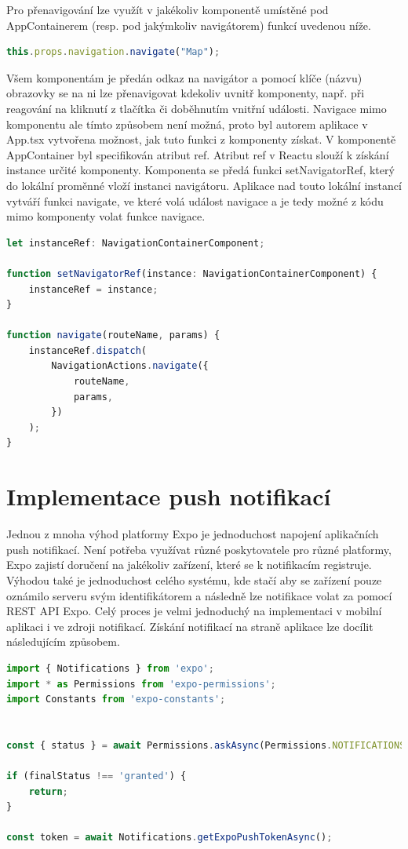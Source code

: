 Pro přenavigování lze využít v jakékoliv komponentě umístěné pod AppContainerem (resp. pod jakýmkoliv navigátorem) funkcí uvedenou níže.

\begin{lstlisting}[language=JavaScript, caption=Přenavigování]
this.props.navigation.navigate("Map");
\end{lstlisting}

Všem komponentám je předán odkaz na navigátor a pomocí klíče (názvu) obrazovky se na ni lze přenavigovat kdekoliv uvnitř komponenty, např. při reagování na kliknutí z tlačítka či doběhnutím vnitřní události. Navigace mimo komponentu ale tímto způsobem není možná, proto byl autorem aplikace v App.tsx vytvořena možnost, jak tuto funkci z komponenty získat. V komponentě AppContainer byl specifikován atribut ref. Atribut ref v Reactu slouží k získání instance určité komponenty. Komponenta se předá funkci setNavigatorRef, který do lokální proměnné vloží instanci navigátoru. Aplikace nad touto lokální instancí vytváří funkci navigate, ve které volá událost navigace a je tedy možné z kódu mimo komponenty volat funkce navigace.

\begin{lstlisting}[language=JavaScript, caption=Přenavigování]
let instanceRef: NavigationContainerComponent;

function setNavigatorRef(instance: NavigationContainerComponent) {
	instanceRef = instance;
}

function navigate(routeName, params) {
	instanceRef.dispatch(
		NavigationActions.navigate({
			routeName,
			params,
		})
	);
}
\end{lstlisting}

\section{Implementace push notifikací}

Jednou z mnoha výhod platformy Expo je jednoduchost napojení aplikačních push notifikací. Není potřeba využívat různé poskytovatele pro různé platformy, Expo zajistí doručení na jakékoliv zařízení, které se k notifikacím registruje. Výhodou také je jednoduchost celého systému, kde stačí aby se zařízení pouze oznámilo serveru svým identifikátorem a následně lze notifikace volat za pomocí REST API Expo. Celý proces je velmi jednoduchý na implementaci v mobilní aplikaci i ve zdroji notifikací. Získání notifikací na straně aplikace lze docílit následujícím způsobem.

\begin{lstlisting}[language=JavaScript, caption=Expo notifikace]
import { Notifications } from 'expo';
import * as Permissions from 'expo-permissions';
import Constants from 'expo-constants';


const { status } = await Permissions.askAsync(Permissions.NOTIFICATIONS);

if (finalStatus !== 'granted') {
	return;
}

const token = await Notifications.getExpoPushTokenAsync();
\end{lstlisting}

